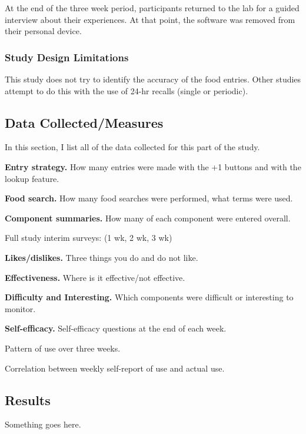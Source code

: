 At the end of the three week period, participants returned to the lab for a guided interview about their experiences. At that point, the software was removed from their personal device. 

\subsubsection{Study Design Limitations}

This study does not try to identify the accuracy of the food entries. Other studies attempt to do this with the use of 24-hr recalls (single or periodic). 

\subsection{Data Collected/Measures}
In this section, I list all of the data collected for this part of the study. 

\begin{enumerate*}
\item \textbf{Entry strategy. } How many entries were made with the +1 buttons and with the lookup feature. 
\item \textbf{Food search. } How many food searches were performed, what terms were used. 
\item \textbf{Component summaries. } How many of each component were entered overall. 
\item Full study interim surveys:  (1 wk, 2 wk, 3 wk)
\begin{itemize*}
\item \textbf{Likes/dislikes.} Three things you do and do not like.
\item \textbf{Effectiveness. } Where is it effective/not effective.
\item \textbf{Difficulty and Interesting. }  Which components were difficult or interesting to monitor.
\item \textbf{Self-efficacy.} Self-efficacy questions at the end of each week. 
\end{itemize*}
\item Pattern of use over three weeks. 
\item Correlation between weekly self-report of use and actual use. 
\end{enumerate*}

\subsection{Results}
Something goes here. 


